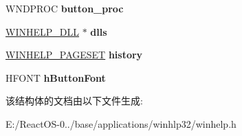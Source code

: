 \begin{DoxyCompactItemize}
W\+N\+D\+P\+R\+OC {\bfseries button\+\_\+proc}
\item 
\mbox{\label{struct_w_i_n_h_e_l_p___g_l_o_b_a_l_s_a4a414e4ad7ec5457a4ae2e1b7b0066cc}} 
\hyperlink{structtag_dll}{W\+I\+N\+H\+E\+L\+P\+\_\+\+D\+LL} $\ast$ {\bfseries dlls}
\item 
\mbox{\label{struct_w_i_n_h_e_l_p___g_l_o_b_a_l_s_a9061f1ca6705d89c1cdfdfbee7cd8771}} 
\hyperlink{structtag_page_set}{W\+I\+N\+H\+E\+L\+P\+\_\+\+P\+A\+G\+E\+S\+ET} {\bfseries history}
\item 
\mbox{\label{struct_w_i_n_h_e_l_p___g_l_o_b_a_l_s_aa9e60f98ab13121d3ee244a54dbaaba4}} 
H\+F\+O\+NT {\bfseries h\+Button\+Font}
\end{DoxyCompactItemize}


该结构体的文档由以下文件生成\+:\begin{DoxyCompactItemize}
\item 
E\+:/\+React\+O\+S-\/0../base/applications/winhlp32/winhelp.\+h\end{DoxyCompactItemize}
